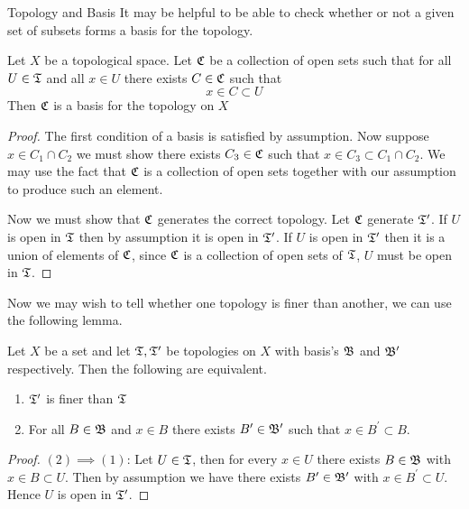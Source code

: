 \begin{chapter}{Topology and Basis}
    It may be helpful to be able to check whether or not a given set of subsets forms a basis for the topology. 
    
    \begin{lem}
        Let $X$ be a topological space. Let $\mathfrak{C}$ be a collection of open sets such that 
        for all $U \in \mathfrak{T}$ and all $x \in U$ there exists $C \in \mathfrak{C}$ such that 
        \[x \in C \subset U\]
        Then $\mathfrak{C}$ is a basis for the topology on $X$
    \end{lem}

    
    \begin{proof}
        The first condition of a basis is satisfied by assumption. Now suppose $x \in C_1 \cap C_2$ we must show there exists 
        $C_3 \in \mathfrak{C}$ such that $x \in C_3 \subset C_1 \cap C_2$. We may use the fact that $\mathfrak{C}$ is a collection of open sets together with our assumption 
        to produce such an element. 

        Now we must show that $\mathfrak{C}$ generates the correct topology. Let $\mathfrak{C}$ generate $\mathfrak{T}^\prime$. If $U$ is open in $\mathfrak{T}$ then by assumption it is open in $\mathfrak{T}^\prime$. 
        If $U$ is open in $\mathfrak{T}^\prime$ then it is a union of elements of $\mathfrak{C}$, since $\mathfrak{C}$ is a collection of open sets of $\mathfrak{T}$, $U$ must be open in $\mathfrak{T}$.
    \end{proof}

    Now we may wish to tell whether one topology is finer than another, we can use the following lemma. 

    
    \begin{lem}
        Let $X$ be a set and let $\mathfrak{T}, \mathfrak{T}^\prime$ be topologies on $X$ with basis's $\mathfrak{B}$ and $\mathfrak{B}^\prime $ respectively. Then the following are equivalent. 
        
        \begin{enumerate}
            \item $\mathfrak{T}^\prime$ is finer than $\mathfrak{T}$
            \item For all $B \in \mathfrak{B}$ and $x \in B$ there exists $B^\prime \in \mathfrak{B}^\prime$ such that $x \in B^\prime \subset B$.  
        \end{enumerate}
    \end{lem}

    
    \begin{proof}
        $(2) \implies (1)$: Let $U \in \mathfrak{T}$, then for every $x \in U$ there exists $B \in \mathfrak{B}$ with $x \in B \subset U$. Then by assumption we have there exists 
        $B^\prime \in \mathfrak{B}^\prime$ with $x \in B^\prime \subset U$. Hence $U$ is open in $\mathfrak{T}^\prime$. 


\end{proof}
\end{chapter}
